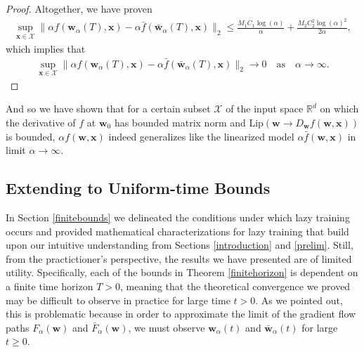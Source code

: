 \documentclass{article}
\begin{document}
\begin{proof}
Altogether, we have proven 
\begin{align*}
    \sup_{\boldsymbol{x} \in \mathcal{X}} \| \alpha f(\boldsymbol{w}_{\alpha}(T), \boldsymbol{x}) - \alpha \bar{f}(\boldsymbol{\bar{w}}_{\alpha}(T), \boldsymbol{x}) \|_2 \leq \frac{M_1C_1 \log(\alpha)}{\alpha} + \frac{M_2C_2^2 \log(\alpha)^2}{2\alpha},
\end{align*}
which implies that 
\begin{align*}
    \sup_{\boldsymbol{x} \in \mathcal{X}} \| \alpha f(\boldsymbol{w}_{\alpha}(T), \boldsymbol{x}) - \alpha \bar{f}(\boldsymbol{\bar{w}}_{\alpha}(T), \boldsymbol{x}) \|_2 \longrightarrow 0 \quad \text{as} \quad \alpha \longrightarrow \infty.
\end{align*}
\end{proof}
And so we have shown that for a certain subset $\mathcal{X}$ of the input space $\mathbb{R}^d$ on which the derivative of $f$ at $\boldsymbol{w}_0$ has bounded matrix norm and $\text{Lip}(\boldsymbol{w} \rightarrow D_{\boldsymbol{w}}f(\boldsymbol{w}, \boldsymbol{x}))$ is bounded, $\alpha f(\boldsymbol{w}, \boldsymbol{x})$ indeed generalizes like the linearized model $\alpha \bar{f}(\boldsymbol{w}, \boldsymbol{x})$ in limit $\alpha \rightarrow \infty$.

\subsection{Extending to Uniform-time Bounds}\label{extenduniform}

In Section \ref{finitebounds} we delineated the conditions under which lazy training occurs and provided mathematical characterizations for lazy training that build upon our intuitive understanding from Sections \ref{introduction} and \ref{prelim}. Still, from the practictioner's perspective, the results we have presented are of limited utility. Specifically, each of the bounds in Theorem \ref{finitehorizon} is dependent on a finite time horizon $T > 0$, meaning that the theoretical convergence we proved may be difficult to observe in practice for large time $t > 0$. As we pointed out, this is problematic because in order to approximate the limit of the gradient flow paths $F_{\alpha}(\boldsymbol{w})$ and $\bar{F}_{\alpha}(\boldsymbol{w})$, we must observe $\boldsymbol{w}_{\alpha}(t)$ and $\boldsymbol{\bar{w}}_{\alpha}(t)$ for large $t \geq 0$.
\end{document}
